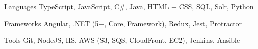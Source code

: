 

\begin{cvskills}

  \cvskill
    {Languages} %
    {TypeScript, JavaScript, C\#, Java, HTML + CSS, SQL, Solr, Python } %

  \cvskill
    {Frameworks} %
    {Angular, .NET (5+, Core, Framework), Redux, Jest, Protractor} %

  \cvskill
    {Tools} %
    {Git, NodeJS, IIS, AWS (S3, SQS, CloudFront, EC2), Jenkins, Ansible} %

\end{cvskills}
